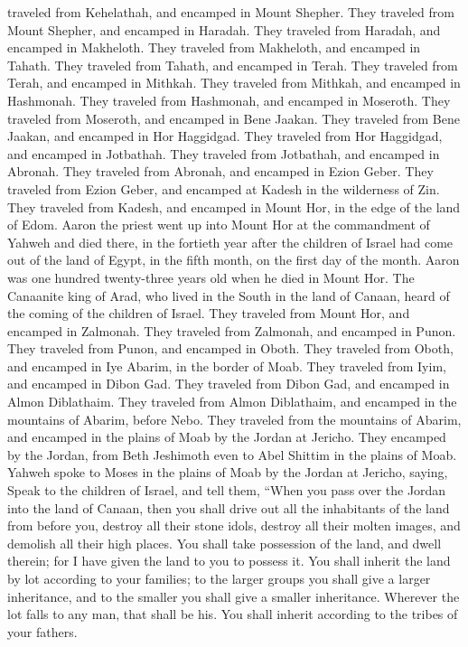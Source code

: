 traveled from Kehelathah, and encamped in Mount Shepher. 
They traveled from Mount Shepher, and encamped in Haradah. 
They traveled from Haradah, and encamped in Makheloth. 
They traveled from Makheloth, and encamped in Tahath.  They
traveled from Tahath, and encamped in Terah.  They traveled
from Terah, and encamped in Mithkah.  They traveled from
Mithkah, and encamped in Hashmonah.  They traveled from
Hashmonah, and encamped in Moseroth.  They traveled from
Moseroth, and encamped in Bene Jaakan.  They traveled from
Bene Jaakan, and encamped in Hor Haggidgad.  They traveled
from Hor Haggidgad, and encamped in Jotbathah.  They
traveled from Jotbathah, and encamped in Abronah.  They
traveled from Abronah, and encamped in Ezion Geber.  They
traveled from Ezion Geber, and encamped at Kadesh in the wilderness of
Zin.  They traveled from Kadesh, and encamped in Mount Hor,
in the edge of the land of Edom.  Aaron the priest went up
into Mount Hor at the commandment of Yahweh and died there, in the
fortieth year after the children of Israel had come out of the land of
Egypt, in the fifth month, on the first day of the month. 
Aaron was one hundred twenty-three years old when he died in Mount Hor.
 The Canaanite king of Arad, who lived in the South in the
land of Canaan, heard of the coming of the children of Israel.
 They traveled from Mount Hor, and encamped in Zalmonah.
 They traveled from Zalmonah, and encamped in Punon.
 They traveled from Punon, and encamped in Oboth.
 They traveled from Oboth, and encamped in Iye Abarim, in
the border of Moab.  They traveled from Iyim, and encamped
in Dibon Gad.  They traveled from Dibon Gad, and encamped
in Almon Diblathaim.  They traveled from Almon Diblathaim,
and encamped in the mountains of Abarim, before Nebo.  They
traveled from the mountains of Abarim, and encamped in the plains of
Moab by the Jordan at Jericho.  They encamped by the
Jordan, from Beth Jeshimoth even to Abel Shittim in the plains of Moab.
 Yahweh spoke to Moses in the plains of Moab by the Jordan
at Jericho, saying,  Speak to the children of Israel, and
tell them, ``When you pass over the Jordan into the land of Canaan,
 then you shall drive out all the inhabitants of the land
from before you, destroy all their stone idols, destroy all their molten
images, and demolish all their high places.  You shall take
possession of the land, and dwell therein; for I have given the land to
you to possess it.  You shall inherit the land by lot
according to your families; to the larger groups you shall give a larger
inheritance, and to the smaller you shall give a smaller inheritance.
Wherever the lot falls to any man, that shall be his. You shall inherit
according to the tribes of your fathers.

